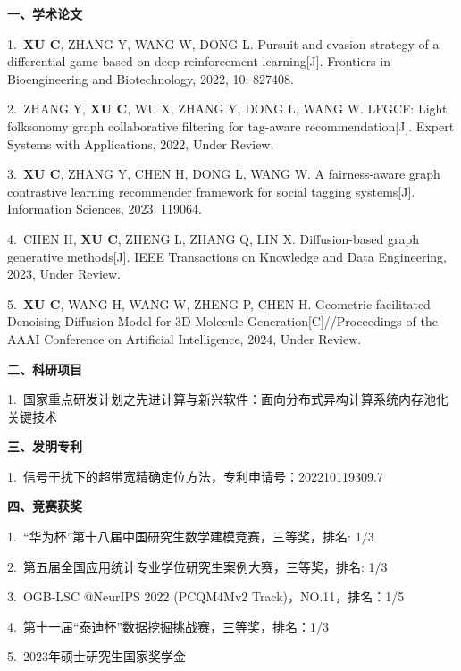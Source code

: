 \cleardoublepage
{}

\noindent {}
\vskip 10pt

\vskip 5pt
\noindent \textbf{一、学术论文}
\vskip 5pt 

1.~\textbf{XU C}, ZHANG Y, WANG W, DONG L. Pursuit and evasion strategy of a differential game based on deep reinforcement learning[J]. Frontiers in Bioengineering and Biotechnology, 2022, 10: 827408.

2.~ZHANG Y, \textbf{XU C}, WU X, ZHANG Y, DONG L, WANG W. LFGCF: Light folksonomy graph collaborative filtering for tag-aware recommendation[J]. Expert Systems with Applications, 2022, Under Review.

3.~\textbf{XU C}, ZHANG Y, CHEN H, DONG L, WANG W. A fairness-aware graph contrastive learning recommender framework for social tagging systems[J]. Information Sciences, 2023: 119064.

4.~CHEN H, \textbf{XU C}, ZHENG L, ZHANG Q, LIN X. Diffusion-based graph generative methods[J]. IEEE Transactions on Knowledge and Data Engineering, 2023, Under Review.

5.~\textbf{XU C}, WANG H, WANG W, ZHENG P, CHEN H. Geometric-facilitated Denoising Diffusion Model for 3D Molecule Generation[C]//Proceedings of the AAAI Conference on Artificial Intelligence, 2024, Under Review.

\vskip 5pt 
\noindent \textbf{二、科研项目}
\vskip 5pt 

1.~国家重点研发计划之先进计算与新兴软件：面向分布式异构计算系统内存池化关键技术

\vskip 5pt 
\noindent \textbf{三、发明专利}
\vskip 5pt 

1.~信号干扰下的超带宽精确定位方法，专利申请号：202210119309.7

\vskip 5pt 
\noindent \textbf{四、竞赛获奖}
\vskip 5pt 

1.~“华为杯”第十八届中国研究生数学建模竞赛，三等奖，排名: 1/3

2.~第五届全国应用统计专业学位研究生案例大赛，三等奖，排名: 1/3

3.~OGB-LSC @NeurIPS 2022 (PCQM4Mv2 Track)，NO.11，排名：1/5

4.~第十一届“泰迪杯”数据挖掘挑战赛，三等奖，排名：1/3

5.~2023年硕士研究生国家奖学金

\newpage